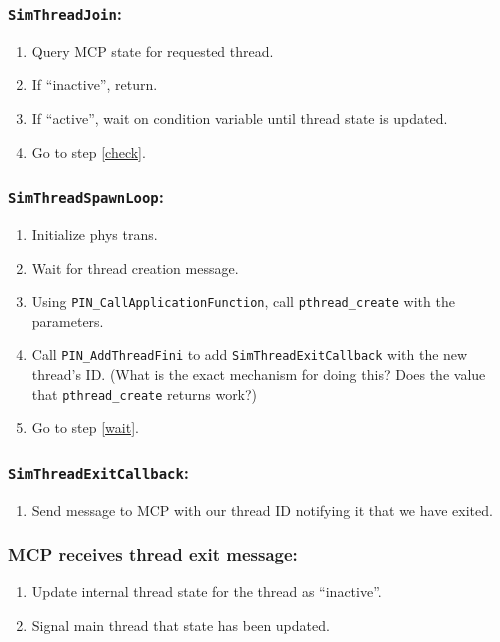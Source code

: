 \documentclass[10pt,twocolumn]{article}
\begin{document}
\subsubsection{\texttt{SimThreadJoin}:}
\begin{enumerate}
\item Query MCP state for requested thread.
\item \label{check} If ``inactive'', return.
\item If ``active'', wait on condition variable until thread state is
  updated.
\item Go to step \ref{check}.
\end{enumerate}

\subsubsection{\texttt{SimThreadSpawnLoop}:}
\begin{enumerate}
\item Initialize phys trans.
\item \label{wait} Wait for thread creation message.
\item Using \texttt{PIN\_CallApplicationFunction}, call
  \texttt{pthread\_create} with the parameters.
\item Call \texttt{PIN\_AddThreadFini} to add
  \texttt{SimThreadExitCallback} with the new thread's ID. (What is
  the exact mechanism for doing this? Does the value that
  \texttt{pthread\_create} returns work?)
\item Go to step \ref{wait}.
\end{enumerate}

\subsubsection{\texttt{SimThreadExitCallback}:}
\begin{enumerate}
\item Send message to MCP with our thread ID notifying it that we have
  exited.
\end{enumerate}

\subsubsection{MCP receives thread exit message:}
\begin{enumerate}
\item Update internal thread state for the thread as ``inactive''.
\item Signal main thread that state has been updated.
\end{enumerate}
\end{document}
